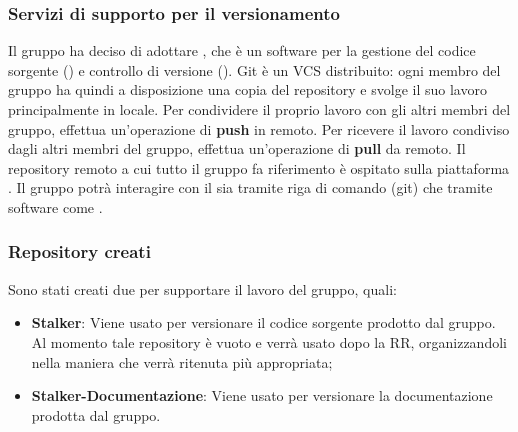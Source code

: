 \subsubsection{Servizi di supporto per il versionamento} 
Il gruppo ha deciso di adottare , che è un software per la gestione del codice sorgente () e controllo di versione ().
Git è un VCS distribuito: ogni membro del gruppo \Gruppo{} ha quindi a disposizione una copia del repository e svolge il suo lavoro principalmente in locale.
Per condividere il proprio lavoro con gli altri membri del gruppo, effettua un'operazione di \textbf{push} in remoto.
Per ricevere il lavoro condiviso dagli altri membri del gruppo, effettua un'operazione di \textbf{pull} da remoto.
Il repository remoto a cui tutto il gruppo fa riferimento è ospitato sulla piattaforma .
Il gruppo \Gruppo{} potrà interagire con il  sia tramite riga di comando (git) che tramite software come .

\subsubsection{Repository creati}
Sono stati creati due  per supportare il lavoro del gruppo, quali:
\begin{itemize}
	\item \textbf{Stalker}: Viene usato per versionare il codice sorgente prodotto dal gruppo.
	Al momento tale repository è vuoto e verrà usato dopo la RR, organizzandoli nella maniera che verrà ritenuta più appropriata;
	\item \textbf{Stalker-Documentazione}: Viene usato per versionare la documentazione prodotta dal gruppo.
\end{itemize}

